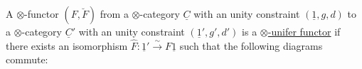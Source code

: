 A $\otimes$-functor $(F,\breve F)$ from a $\otimes$-category $\underline{C}$ with an unity constraint $(\underline{1},g,d)$ to a $\otimes$-category $\underline{C}'$ with an unity constraint $(\underline{1}',g',d')$ is a \uline{$\otimes$-unifer functor} if there exists an isomorphism $\hat F:\underline{1}'\xrightarrow{\sim}F\underline{1}$ such that the following diagrams commute:
